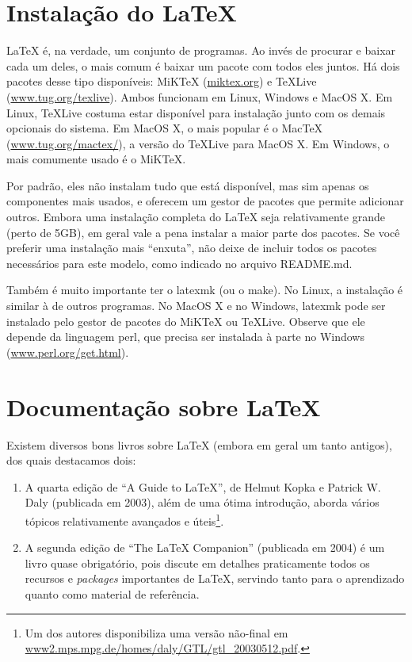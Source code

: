 \section{Instalação do \LaTeX{}}
\label{sec:install}


\LaTeX{} é, na verdade, um conjunto de programas. Ao invés de procurar e
baixar cada um deles, o mais comum é baixar um pacote com todos eles juntos.
Há dois pacotes desse tipo disponíveis: MiK\TeX{} (\url{miktex.org}) e
\TeX{}Live (\url{www.tug.org/texlive}). Ambos funcionam em Linux, Windows e
MacOS X. Em Linux, \TeX{}Live costuma estar disponível para instalação junto
com os demais opcionais do sistema. Em MacOS X, o mais popular é o Mac\TeX{}
(\url{www.tug.org/mactex/}), a versão do \TeX{}Live para MacOS X.  Em Windows,
o mais comumente usado é o MiK\TeX{}.

Por padrão, eles não instalam tudo que está disponível, mas sim apenas os
componentes mais usados, e oferecem um gestor de pacotes que permite adicionar
outros. Embora uma instalação completa do \LaTeX{} seja relativamente grande
(perto de 5GB), em geral vale a pena instalar a maior parte dos pacotes. Se
você preferir uma instalação mais ``enxuta'', não deixe de incluir todos os
pacotes necessários para este modelo, como indicado no arquivo README.md.

Também é muito importante ter o \textsf{latexmk} (ou o \textsf{make}). No Linux,
a instalação é similar à de outros programas. No MacOS X e no Windows,
\textsf{latexmk} pode ser instalado pelo gestor de pacotes do MiK\TeX{} ou
\TeX{}Live. Observe que ele depende da linguagem \textsf{perl}, que precisa ser
instalada à parte no Windows (\url{www.perl.org/get.html}).

\section{Documentação sobre \LaTeX}
\label{sec:docs}

Existem diversos bons livros sobre \LaTeX{} (embora em geral um tanto
antigos), dos quais destacamos dois:

\begin{enumerate}

  \item A quarta edição de ``A Guide to \LaTeX'', de Helmut Kopka e
        Patrick W. Daly (publicada em 2003), além de uma ótima
        introdução, aborda vários tópicos relativamente avançados e
        úteis\footnote{Um dos autores disponibiliza uma versão não-final
        em \url{www2.mps.mpg.de/homes/daly/GTL/gtl_20030512.pdf}.}.
  \item A segunda edição de ``The \LaTeX{} Companion'' (publicada em
        2004) é um livro quase obrigatório, pois discute em detalhes
        praticamente todos os recursos e \textit{packages} importantes
        de \LaTeX{}, servindo tanto para o aprendizado quanto como
        material de referência.

\end{enumerate}


